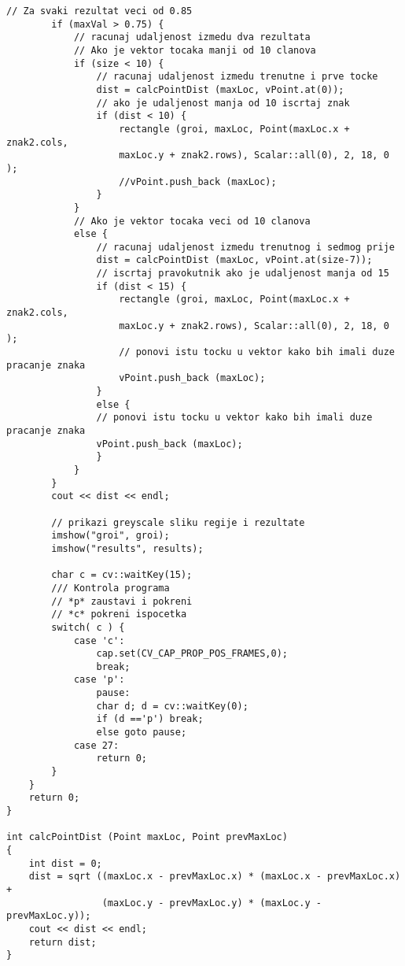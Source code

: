 \begin{lstlisting}[caption={}]
        // Za svaki rezultat veci od 0.85 
        if (maxVal > 0.75) {
            // racunaj udaljenost izmedu dva rezultata
            // Ako je vektor tocaka manji od 10 clanova
            if (size < 10) {
                // racunaj udaljenost izmedu trenutne i prve tocke
                dist = calcPointDist (maxLoc, vPoint.at(0));
                // ako je udaljenost manja od 10 iscrtaj znak
                if (dist < 10) {
                    rectangle (groi, maxLoc, Point(maxLoc.x + znak2.cols, 
                    maxLoc.y + znak2.rows), Scalar::all(0), 2, 18, 0 );
                    //vPoint.push_back (maxLoc);    
                }
            }
            // Ako je vektor tocaka veci od 10 clanova
            else {
                // racunaj udaljenost izmedu trenutnog i sedmog prije 
                dist = calcPointDist (maxLoc, vPoint.at(size-7));  
                // iscrtaj pravokutnik ako je udaljenost manja od 15
                if (dist < 15) {
                    rectangle (groi, maxLoc, Point(maxLoc.x + znak2.cols, 
                    maxLoc.y + znak2.rows), Scalar::all(0), 2, 18, 0 );
                    // ponovi istu tocku u vektor kako bih imali duze pracanje znaka
                    vPoint.push_back (maxLoc);  
                }
                else {
                // ponovi istu tocku u vektor kako bih imali duze pracanje znaka
                vPoint.push_back (maxLoc);
                }
            }
        }
        cout << dist << endl;
        
        // prikazi greyscale sliku regije i rezultate
        imshow("groi", groi);
        imshow("results", results);
        
        char c = cv::waitKey(15);
        /// Kontrola programa         
        // *p* zaustavi i pokreni
        // *c* pokreni ispocetka
        switch( c ) {
            case 'c': 
                cap.set(CV_CAP_PROP_POS_FRAMES,0); 
                break;    
            case 'p': 
                pause:
                char d; d = cv::waitKey(0);
                if (d =='p') break;
                else goto pause;
            case 27:
                return 0;
        }        
    }
    return 0;
}

int calcPointDist (Point maxLoc, Point prevMaxLoc)
{
    int dist = 0;
    dist = sqrt ((maxLoc.x - prevMaxLoc.x) * (maxLoc.x - prevMaxLoc.x) +
                 (maxLoc.y - prevMaxLoc.y) * (maxLoc.y - prevMaxLoc.y));    
    cout << dist << endl;
    return dist;
}
\end{lstlisting}



